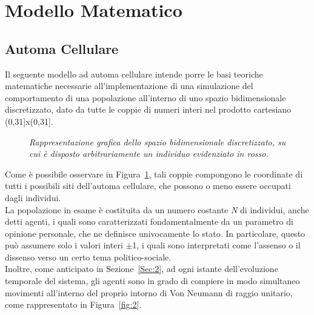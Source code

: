 \documentclass{article}
\begin{document}
\section{Modello Matematico}
\label{Sec:3}

\subsection{Automa Cellulare}
\label{Sec:3.1}
Il seguente modello ad automa cellulare intende porre le basi teoriche matematiche necessarie all'implementazione di una simulazione del comportamento di una popolazione all’interno di uno spazio bidimensionale discretizzato, dato da tutte le coppie di numeri interi nel prodotto cartesiano (0,31]x(0,31].

\begin{figure}[h]
\centering
{}
\caption{\textit{Rappresentazione grafica dello spazio bidimensionale discretizzato, su cui è disposto arbitrariamente un individuo evidenziato in rosso.}}
\label{fig:1}
\end{figure}

Come è possibile osservare in Figura~\ref{fig:1}, tali coppie compongono le coordinate di tutti i possibili siti dell'automa cellulare, che possono o meno essere occupati dagli individui.
\\ La popolazione in esame è costituita da un numero costante \textit{N} di individui, anche detti agenti, i quali sono caratterizzati fondamentalmente da un parametro di opinione personale, che ne definisce univocamente lo stato.
In particolare, questo può assumere solo i valori interi $\pm$1, i quali sono interpretati come l'assenso o il dissenso verso un certo tema politico-sociale.
\bigskip \bigskip
\\ Inoltre, come anticipato in Sezione~\ref{Sec:2}, ad ogni istante dell’evoluzione temporale del sistema, gli agenti sono in grado di compiere in modo simultaneo movimenti all'interno del proprio intorno di Von Neumann di raggio unitario, come rappresentato in Figura~\ref{fig:2}.
\end{document}
